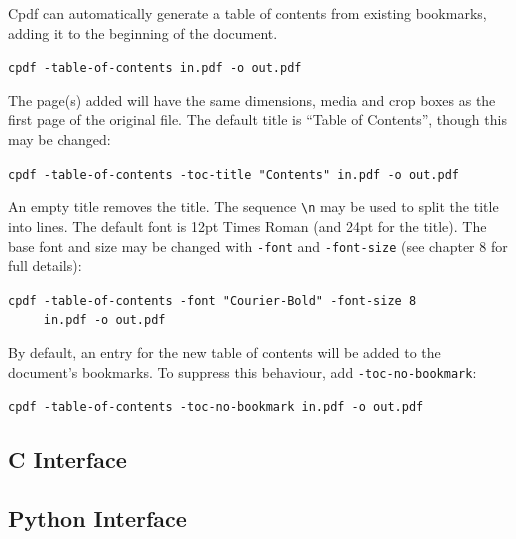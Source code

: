 \documentclass{book}
\begin{document}
Cpdf can automatically generate a table of contents from existing bookmarks, adding it to the beginning of the document.

  \begin{framed}
   \noindent\small\verb!cpdf -table-of-contents in.pdf -o out.pdf!
  \end{framed}

\noindent The page(s) added will have the same dimensions, media and crop boxes as the first page of the original file. The default title is ``Table of Contents'', though this may be changed:

  \begin{framed}
   \noindent\small\verb!cpdf -table-of-contents -toc-title "Contents" in.pdf -o out.pdf!
  \end{framed}

\noindent An empty title removes the title. The sequence \texttt{\textbackslash n} may be used to split the title into lines. The default font is 12pt Times Roman (and 24pt for the title). The base font and size may be changed with \texttt{-font} and \texttt{-font-size} (see chapter 8 for full details):

  \begin{framed}
   \noindent\small\verb!cpdf -table-of-contents -font "Courier-Bold" -font-size 8!\\
   \noindent\small\verb!     in.pdf -o out.pdf!
  \end{framed}

\noindent By default, an entry for the new table of contents will be added to the document's bookmarks. To suppress this behaviour, add \texttt{-toc-no-bookmark}:

  \begin{framed}
   \noindent\small\verb!cpdf -table-of-contents -toc-no-bookmark in.pdf -o out.pdf!
  \end{framed}



\clearpage\pagestyle{empty}

\begin{cpdflib}
\clearpage
\section*{C Interface}
\begin{small}\tt

\end{small}
\end{cpdflib}

\begin{pycpdflib}
\clearpage
\section*{Python Interface}
\begin{small}\tt

\end{small}
\end{pycpdflib}
\end{document}
